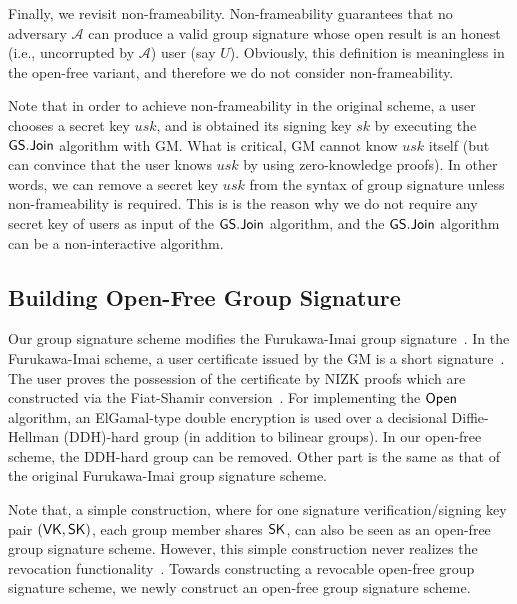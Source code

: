 \documentclass[preprint]{sig-alternate}
\begin{document}
\noindent

Finally, we revisit non-frameability. 
Non-frameability guarantees that no adversary $\mathcal{A}$ can produce a valid group signature whose open result is an honest (i.e., uncorrupted by $\mathcal{A}$) user (say $U$). 
Obviously, this definition is meaningless in the open-free variant, and therefore we do not consider non-frameability. 

Note that in order to achieve non-frameability in the original scheme, a user chooses a secret key $usk$, and is obtained its signing key $sk$ by executing the ${\sf GS.Join}$ algorithm with GM. What is critical, GM cannot know $usk$ itself (but can convince that the user knows $usk$ by using zero-knowledge proofs). In other words, we can remove a secret key $usk$ from the syntax of group signature unless non-frameability is required. 
This is is the reason why we do not require any secret key of users as input of the ${\sf GS.Join}$ algorithm, and the ${\sf GS.Join}$ algorithm can be a non-interactive algorithm. 

\subsection{Building Open-Free Group Signature}

Our group signature scheme modifies the Furukawa-Imai group signature~\cite{[FurukawaI06]}. 
In the Furukawa-Imai scheme, 
a user certificate issued by the GM is a short signature~\cite{[BonehB08]}. 
The user proves the possession of the certificate by NIZK proofs which are constructed via the Fiat-Shamir conversion~\cite{[FiatS86]}. 
For implementing the ${\sf Open}$ algorithm, an ElGamal-type double encryption is used over a decisional Diffie-Hellman (DDH)-hard group (in addition to bilinear groups).
In our open-free scheme, the DDH-hard group can be removed. 
Other part is the same as that of the original Furukawa-Imai group signature scheme. 

Note that, a simple construction, where for one signature verification/signing key pair $({\sf VK}, {\sf SK})$, each group member shares ${\sf SK}$, can also be seen as an open-free group signature scheme. However, this simple construction never realizes the revocation functionality~\cite{[LibertPY12]}. 
Towards constructing a revocable open-free group signature scheme, we newly construct an open-free group signature scheme. 
\end{document}
